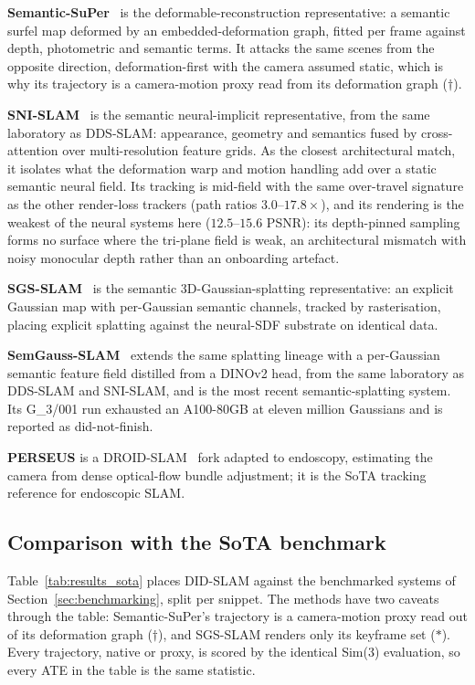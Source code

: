 \documentclass{article}
\begin{document}
\textbf{Semantic-SuPer}~\cite{Lin2023} is the deformable-reconstruction representative: a semantic surfel map deformed by an embedded-deformation graph, fitted per frame against depth, photometric and semantic terms. It attacks the same scenes from the opposite direction, deformation-first with the camera assumed static, which is why its trajectory is a camera-motion proxy read from its deformation graph ($\dagger$).

\textbf{SNI-SLAM}~\cite{Zhu2024} is the semantic neural-implicit representative, from the same laboratory as DDS-SLAM: appearance, geometry and semantics fused by cross-attention over multi-resolution feature grids. As the closest architectural match, it isolates what the deformation warp and motion handling add over a static semantic neural field. Its tracking is mid-field with the same over-travel signature as the other render-loss trackers (path ratios $3.0$--$17.8\times$), and its rendering is the weakest of the neural systems here ($12.5$--$15.6$ PSNR): its depth-pinned sampling forms no surface where the tri-plane field is weak, an architectural mismatch with noisy monocular depth rather than an onboarding artefact.

\textbf{SGS-SLAM}~\cite{sgsslam} is the semantic 3D-Gaussian-splatting representative: an explicit Gaussian map with per-Gaussian semantic channels, tracked by rasterisation, placing explicit splatting against the neural-SDF substrate on identical data.

\textbf{SemGauss-SLAM}~\cite{Zhu2025} extends the same splatting lineage with a per-Gaussian semantic feature field distilled from a DINOv2 head, from the same laboratory as DDS-SLAM and SNI-SLAM, and is the most recent semantic-splatting system. Its G\_3/001 run exhausted an A100-80GB at eleven million Gaussians and is reported as did-not-finish.

\textbf{PERSEUS} is a DROID-SLAM~\cite{Teed2022} fork adapted to endoscopy, estimating the camera from dense optical-flow bundle adjustment; it is the SoTA tracking reference for endoscopic SLAM.
\subsection{Comparison with the SoTA benchmark}
\label{sec:results_sota}

Table~\ref{tab:results_sota} places DID-SLAM against the benchmarked systems of Section~\ref{sec:benchmarking}, split per snippet. The methods have two caveats through the table: Semantic-SuPer's trajectory is a camera-motion proxy read out of its deformation graph ($\dagger$), and SGS-SLAM renders only its keyframe set ($*$). Every trajectory, native or proxy, is scored by the identical Sim(3) evaluation, so every ATE in the table is the same statistic.
\end{document}
